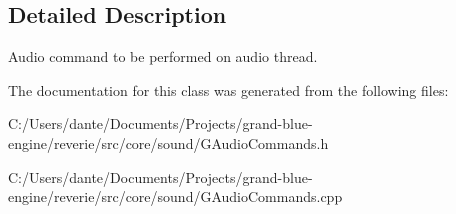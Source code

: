 \subsection{Detailed Description}
Audio command to be performed on audio thread. 

The documentation for this class was generated from the following files\+:\begin{DoxyCompactItemize}
\item 
C\+:/\+Users/dante/\+Documents/\+Projects/grand-\/blue-\/engine/reverie/src/core/sound/G\+Audio\+Commands.\+h\item 
C\+:/\+Users/dante/\+Documents/\+Projects/grand-\/blue-\/engine/reverie/src/core/sound/G\+Audio\+Commands.\+cpp\end{DoxyCompactItemize}
